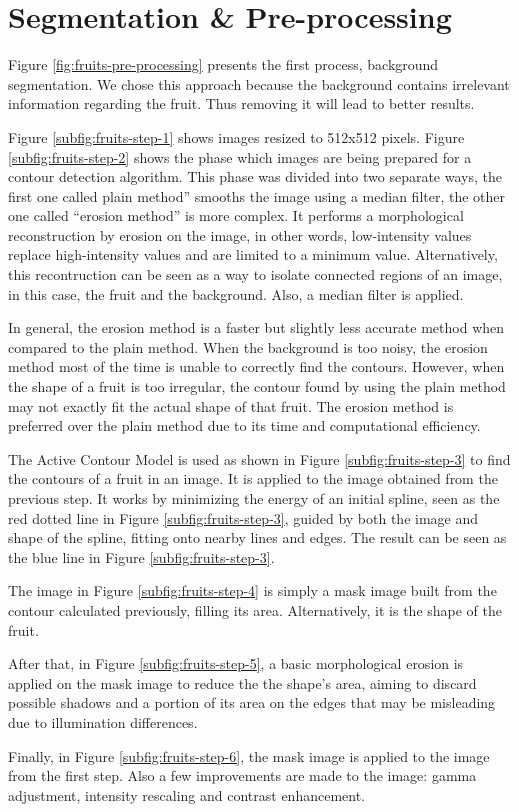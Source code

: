 \documentclass[../main.tex]{subfile}
\begin{document}
\section{Segmentation \& Pre-processing} \label{sec:segmentation-&-preprocesing}


Figure \ref{fig:fruits-pre-processing} presents the first process, background segmentation. We chose this approach because the background contains irrelevant information regarding the fruit. Thus removing it will lead to better results.

Figure \ref{subfig:fruits-step-1} shows images resized to 512x512 pixels. Figure \ref{subfig:fruits-step-2} shows the phase which  images are being prepared for a contour detection algorithm.
This phase was divided into two separate ways, the first one called plain method'' smooths the image using a median filter, the other one called ``erosion method'' is more complex.
It performs a morphological reconstruction by erosion on the image, in other words, low-intensity values replace high-intensity values and are limited to a minimum value. Alternatively, this recontruction can be seen as a way to isolate connected regions of an image, in this case, the fruit and the background. Also, a median filter is applied.

In general, the erosion method is a faster but slightly less accurate method when compared to the plain method. When the background is too noisy, the erosion method most of the time is unable to correctly find the contours. However, when the shape of a fruit is too irregular, the contour found by using the plain method may not exactly fit the actual shape of that fruit. The erosion method is preferred over the plain method due to its time and computational efficiency.

The Active Contour Model \cite{III-item1} is used as shown in Figure \ref{subfig:fruits-step-3} to find the contours of a fruit in an image. It is applied to the image obtained from the previous step. It works by minimizing the energy of an initial spline, seen as the red dotted line in Figure \ref{subfig:fruits-step-3}, guided by both the image and shape of the spline, fitting onto nearby lines and edges. The result can be seen as the blue line in Figure \ref{subfig:fruits-step-3}.

The image in Figure \ref{subfig:fruits-step-4} is simply a mask image built from the contour calculated previously, filling its area. Alternatively, it is the shape of the fruit.

After that, in Figure \ref{subfig:fruits-step-5}, a basic morphological erosion is applied on the mask image to reduce the the shape's area, aiming to discard possible shadows and a portion of its area on the edges that may be misleading due to illumination differences.

Finally, in Figure \ref{subfig:fruits-step-6}, the mask image is applied to the image from the first step. Also a few improvements are made to the image: gamma adjustment, intensity rescaling and contrast enhancement.
\end{document}
